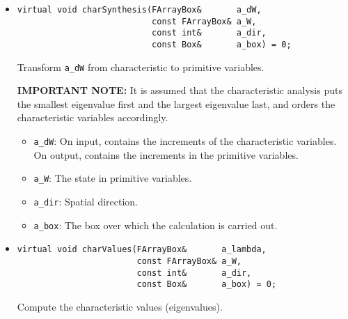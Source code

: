 \begin{itemize}
{\bf IMPORTANT NOTE:} It is assumed that the characteristic analysis puts the
smallest eigenvalue first and the largest eigenvalue last, and orders the
characteristic variables accordingly.
\begin{itemize}
\item \verb/a_dW/:
On input, contains the increments of the primitive variables.
On output, contains the increments in the characteristic variables.
\vspace{-0.07in}
\item \verb/a_W/:  The state in primitive variables.
\vspace{-0.07in}
\item \verb/a_dir/: Spatial direction.
\vspace{-0.07in}
\item \verb/a_box/:  The box over which the calculation is carried out.
\end{itemize}

\item \begin{small}\begin{verbatim}
virtual void charSynthesis(FArrayBox&       a_dW,
                           const FArrayBox& a_W,
                           const int&       a_dir,
                           const Box&       a_box) = 0;
\end{verbatim}\end{small}
Transform \verb/a_dW/ from characteristic to primitive variables.

{\bf IMPORTANT NOTE:} It is assumed that the characteristic analysis puts the
smallest eigenvalue first and the largest eigenvalue last, and orders the
characteristic variables accordingly.
\begin{itemize}
\item \verb/a_dW/:
 On input, contains the increments of the characteristic variables.
 On output, contains the increments in the primitive variables.
\vspace{-0.07in}
\item \verb/a_W/:  The state in primitive variables.
\vspace{-0.07in}
\item \verb/a_dir/: Spatial direction.
\vspace{-0.07in}
\item \verb/a_box/:  The box over which the calculation is carried out.
\end{itemize}

\item \begin{small}\begin{verbatim}
virtual void charValues(FArrayBox&       a_lambda,
                        const FArrayBox& a_W,
                        const int&       a_dir,
                        const Box&       a_box) = 0;
\end{verbatim}\end{small}
Compute the characteristic values (eigenvalues).


\end{itemize}
